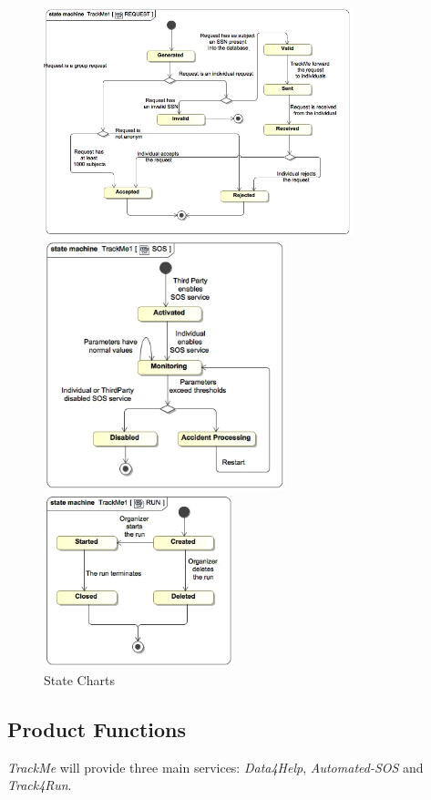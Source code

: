 \documentclass[a4paper]{article}
\begin{document}
    \begin{figure}[!htpb]
        \centering
        \includegraphics[width=90mm, keepaspectratio]{images/UML/state_request.jpg}
        \hfill
        
        \centering
        \includegraphics[width=70mm, keepaspectratio]{images/UML/state_sos.jpg}
        
        \includegraphics[width=55mm, keepaspectratio]{images/UML/state_run.jpg}
        \caption{State Charts}
    \end{figure}
    
    \newpage
    
    \subsection{Product Functions}
    \textit{TrackMe} will provide three main services: \textit{Data4Help}, \textit{Automated-SOS} and \textit{Track4Run}.
    
\end{document}
